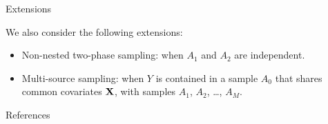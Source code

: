 \documentclass[final]{beamer}
\newlength{\sepwidth}
\newlength{\colwidth}
\newcommand{\separatorcolumn}{\begin{column}{\sepwidth}\end{column}}
\begin{document}
\begin{frame}[t]
\begin{columns}[t]
\begin{column}{\colwidth}
  \begin{block}{Extensions}

    We also consider the following extensions:

    \begin{itemize}
      \item Non-nested two-phase sampling: when $A_1$ and $A_2$ are independent.
      \item Multi-source sampling: when $Y$ is contained in a sample $A_0$ that
        shares common covariates $\bf X$, with samples $A_1$, $A_2$, \dots, $A_M$.
    \end{itemize}
  \end{block}

  \vspace{-1.0cm}

  \begin{block}{References}

    \printbibliography

  \end{block}

\end{column}

\separatorcolumn
\end{columns}
\end{frame}
\end{document}
